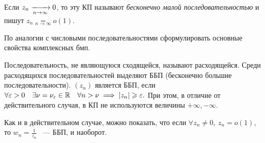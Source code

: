 \documentclass[../../main.tex]{subfiles}
\begin{document}
Если $ z_n \xrightarrow[n \rightarrow \infty]{} 0 $, то эту КП называют \emph{бесконечно 
малой последовательностью} и пишут $ z_n \underset{n \to \infty}{=} o(1) $.

\begin{exc}
	По аналогии с числовыми последовательностями сформулировать основные свойства 
	комплексных бмп.
\end{exc}

\medskip

Последовательность, не являющуюся сходящейся, называют расходящейся. Среди 
расходящихся последовательностей выделяют ББП (бесконечно большие 
последовательности).
$ (z_n) $ является ББП, если $ \forall \varepsilon > 0\quad \exists \nu = \nu_\varepsilon \in 
\mathbb{R}\quad \forall n > \nu \implies |z_n| \geqslant \varepsilon.$
При этом, в отличие от действительного случая, в КП не используются величины $ 
+\infty, -\infty $.

Как и в действительном случае, можно показать, что если $ \forall z_n \neq 
0,\ z_n = o(1) $, то $ w_n = \frac{1}{z_n} $ ~--- ББП, и наоборот.
\end{document}
